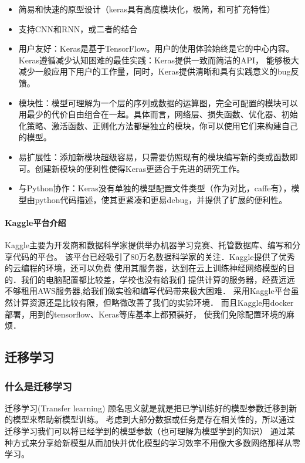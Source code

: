 \begin{itemize}
    \item 简易和快速的原型设计（keras具有高度模块化，极简，和可扩充特性）
    \item 支持CNN和RNN，或二者的结合
    \item 用户友好：Keras是基于TensorFlow。用户的使用体验始终是它的中心内容。Keras遵循减少认知困难的最佳实践：Keras提供一致而简洁的API， 能够极大减少一般应用下用户的工作量，同时，Keras提供清晰和具有实践意义的bug反馈。
    \item 模块性：模型可理解为一个层的序列或数据的运算图，完全可配置的模块可以用最少的代价自由组合在一起。具体而言，网络层、损失函数、优化器、初始化策略、激活函数、正则化方法都是独立的模块，你可以使用它们来构建自己的模型。
    \item 易扩展性：添加新模块超级容易，只需要仿照现有的模块编写新的类或函数即可。创建新模块的便利性使得Keras更适合于先进的研究工作。
    \item 与Python协作：Keras没有单独的模型配置文件类型（作为对比，caffe有），模型由python代码描述，使其更紧凑和更易debug，并提供了扩展的便利性。
\end{itemize}

\paragraph{Kaggle平台介绍}

Kaggle主要为开发商和数据科学家提供举办机器学习竞赛、托管数据库、编写和分享代码的平台。
该平台已经吸引了80万名数据科学家的关注．Kaggle提供了优秀的云编程的环境，还可以免费
使用其服务器，达到在云上训练神经网络模型的目的．我们的电脑配置都比较差，学校也没有给我们
提供计算的服务器，经费远远不够租用AWS服务器,给我们做实验和编写代码带来极大困难．
采用Kaggle平台虽然计算资源还是比较有限，但略微改善了我们的实验环境．
而且Kaggle用docker部署，用到的tensorflow、Keras等库基本上都预装好，
使我们免除配置环境的麻烦．


\subsection{迁移学习}

\subsubsection{什么是迁移学习}

迁移学习(Transfer learning) 顾名思义就是就是把已学训练好的模型参数迁移到新的模型来帮助新模型训练。
考虑到大部分数据或任务是存在相关性的，所以通过迁移学习我们可以将已经学到的模型参数（也可理解为模型学到的知识）
通过某种方式来分享给新模型从而加快并优化模型的学习效率不用像大多数网络那样从零学习。

